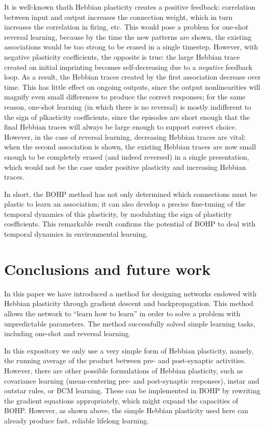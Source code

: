 \documentclass{article}
\begin{document}
It is well-known thath Hebbian plasticity
creates a positive feedback: correlation between input and output increases the
connection weight, which in turn increases the correlation in firing, etc. This would
pose a problem for one-shot reversal learning, because by the time the new patterns are
shown, the existing associations would be too strong to be erased in a single
timestep.
However, with negative plasticity coefficients, the opposite is true: the large
Hebbian trace created on initial imprinting becomes self-decreasing due to a
\emph{negative} feedback loop. As a result, the Hebbian traces created by the first
association decrease over time. This has little effect on ongoing outputs, since
the output nonlinearities will magnify even small differences to
produce the correct responses; for the same reason, one-shot learning (in which
there is no reversal) is mostly indifferent to the sign of plkasticity coefficients,
since the episodes are short enough that the final Hebbian traces will always be
large enough to support correct choice. However, in the case of reversal
learning, decreasing Hebbian traces are vital: when the second association is shown,
the existing Hebbian traces  are now small enough to be completely erased (and
indeed reversed) in a single presentation, which would not be the case under
positive plasticity and increasing Hebbian traces.

In short, the BOHP method has not only determined which connections must be
plastic to learn an association; it can also develop a precise fine-tuning of
the temporal dynamics of this plasticity, by modulating the sign of plasticity
coefficients. This remarkable result confirms the potential of BOHP to deal with
temporal dynamics in environmental learning.



\section{Conclusions and future work}


In this paper we have introduced a method for designing networks endowed with
Hebbian plasticity through gradient descent and backpropagation. This method
allows the network to ``learn how to learn'' in order to solve a problem with
unpredictable parameters. The method successfully solved simple learning tasks, including
one-shot and reversal learning.

In this expository we only use a very simple form of Hebbian plasticity, namely,
the running average of the product between pre- and post-synaptic activities.
However, there are other possible formulations of Hebbian plasticity, such as
covariance learning (mean-centering pre- and post-synaptic responses), instar
and outstar rules, or BCM learning. These can be implemented in BOHP by
rewriting the gradient equations appropriately, which might expand the
capacities of BOHP. However, as shown above, the simple Hebbian plasticity used
here can already produce fast, reliable lifelong learning.
\end{document}
